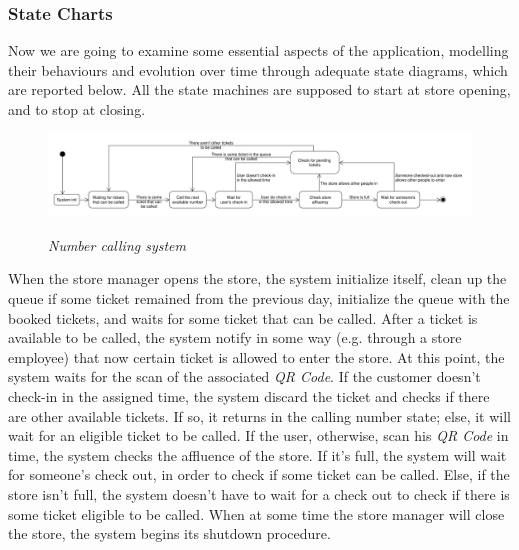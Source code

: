 \documentclass{article}
\begin{document}
		\newpage
		
		\subsubsection{State Charts}
		
		Now we are going to examine some essential aspects of the application, modelling their behaviours and evolution over time through adequate state diagrams, which are reported below. All the state machines are supposed to start at store opening, and to stop at closing.
		
		\begin{figure}[!h]
			\centering
			\hspace*{-1.9cm}\includegraphics[scale=0.32]{StateCharts/number_calling_system.pdf} \\
			\caption{\emph{Number calling system}}
		\end{figure}
	
		When the store manager opens the store, the system initialize itself, clean up the queue if some ticket remained from the previous day, initialize the queue with the booked tickets, and waits for some ticket that can be called. After a ticket is available to be called, the system notify in some way (e.g. through a store employee) that now certain ticket is allowed to enter the store. At this point, the system waits for the scan of the associated \emph{QR Code}. If the customer doesn't check-in in the assigned time, the system discard the ticket and checks if there are other available tickets. If so, it returns in the calling number state; else, it will wait for an eligible ticket to be called. If the user, otherwise, scan his \emph{QR Code} in time, the system checks the affluence of the store. If it's full, the system will wait for someone's check out, in order to check if some ticket can be called. Else, if the store isn't full, the system doesn't have to wait for a check out to check if there is some ticket eligible to be called. When at some time the store manager will close the store, the system begins its shutdown procedure.
		
		\bigskip
		
\end{document}
